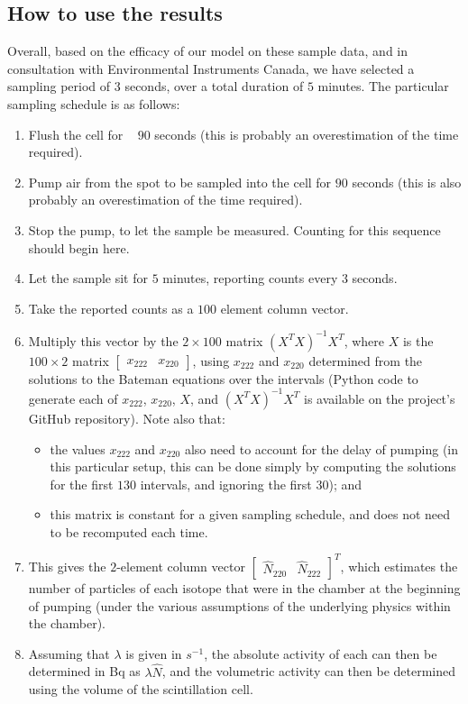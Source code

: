 \documentclass[11pt]{m2pi}
\begin{document}
\subsection{How to use the results}\label{SS:HowToUse}
Overall, based on the efficacy of our model on these sample data, and in consultation with Environmental Instruments Canada, we have selected a sampling period of $3$ seconds, over a total duration of $5$ minutes. The particular sampling schedule is as follows:
\begin{enumerate}
    \item Flush the cell for ~ $90$ seconds (this is probably an overestimation of the time required).
    \item Pump air from the spot to be sampled into the cell for $90$ seconds (this is also probably an overestimation of the time required).
    \item Stop the pump, to let the sample be measured. Counting for this sequence should begin here.
    \item Let the sample sit for $5$ minutes, reporting counts every $3$ seconds.
    \item Take the reported counts as a $100$ element column vector. 
    \item Multiply this vector by the $2\times 100$ matrix $(X^TX)^{-1}X^T$, where $X$ is the $100\times 2$ matrix $\begin{bmatrix} x_{222} & {x_{220}} \end{bmatrix}$, using $x_{222}$ and ${x_{220}}$ determined from the solutions to the Bateman equations over the intervals (Python code to generate each of $x_{222}$, ${x_{220}}$, $X$, and $(X^TX)^{-1}X^T$ is available on the project's GitHub repository)\cite{Github}. Note also that:
    \begin{itemize}
        \item the values $x_{222}$ and ${x_{220}}$ also need to account for the delay of pumping (in this particular setup, this can be done simply by computing the solutions for the first $130$ intervals, and ignoring the first $30$); and
        \item this matrix is constant for a given sampling schedule, and does not need to be recomputed each time. 
    \end{itemize}
    \item This gives the $2$-element column vector $\begin{bmatrix}\hat{N}_{220} & \hat{N}_{222}\end{bmatrix}^T$, which estimates the number of particles of each isotope that were in the chamber at the beginning of pumping (under the various assumptions of the underlying physics within the chamber). 
    \item Assuming that $\lambda$ is given in $s^{-1}$, the absolute activity of each can then be determined in Bq as $\lambda\hat{N}$, and the volumetric activity can then be determined using the volume of the scintillation cell.
\end{enumerate}
\vspace*{-0.5cm}
\end{document}
